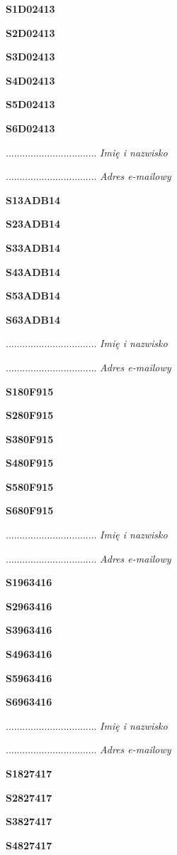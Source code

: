 \Large \textbf{S1D02413}

\Large \textbf{S2D02413}

\Large \textbf{S3D02413}

\Large \textbf{S4D02413}

\Large \textbf{S5D02413}

\Large \textbf{S6D02413}

.................................
\textit{Imię i nazwisko}

.................................
\textit{Adres e-mailowy}

\Large \textbf{S13ADB14}

\Large \textbf{S23ADB14}

\Large \textbf{S33ADB14}

\Large \textbf{S43ADB14}

\Large \textbf{S53ADB14}

\Large \textbf{S63ADB14}

.................................
\textit{Imię i nazwisko}

.................................
\textit{Adres e-mailowy}

\Large \textbf{S180F915}

\Large \textbf{S280F915}

\Large \textbf{S380F915}

\Large \textbf{S480F915}

\Large \textbf{S580F915}

\Large \textbf{S680F915}

.................................
\textit{Imię i nazwisko}

.................................
\textit{Adres e-mailowy}

\Large \textbf{S1963416}

\Large \textbf{S2963416}

\Large \textbf{S3963416}

\Large \textbf{S4963416}

\Large \textbf{S5963416}

\Large \textbf{S6963416}

.................................
\textit{Imię i nazwisko}

.................................
\textit{Adres e-mailowy}

\Large \textbf{S1827417}

\Large \textbf{S2827417}

\Large \textbf{S3827417}

\Large \textbf{S4827417}

